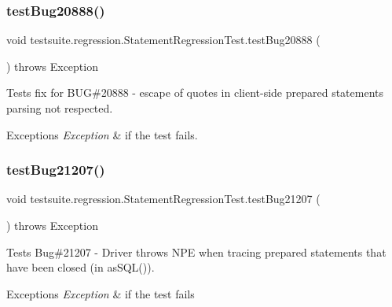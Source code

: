\subsubsection{\texorpdfstring{test\+Bug20888()}{testBug20888()}}
{\footnotesize\ttfamily void testsuite.\+regression.\+Statement\+Regression\+Test.\+test\+Bug20888 (\begin{DoxyParamCaption}{ }\end{DoxyParamCaption}) throws Exception}

Tests fix for B\+UG\#20888 -\/ escape of quotes in client-\/side prepared statements parsing not respected.


\begin{DoxyExceptions}{Exceptions}
{\em Exception} & if the test fails. \\
\hline
\end{DoxyExceptions}
\mbox{\label{classtestsuite_1_1regression_1_1_statement_regression_test_a16c4c52784a96bfcf47397ce9a1d0efb}} 
\subsubsection{\texorpdfstring{test\+Bug21207()}{testBug21207()}}
{\footnotesize\ttfamily void testsuite.\+regression.\+Statement\+Regression\+Test.\+test\+Bug21207 (\begin{DoxyParamCaption}{ }\end{DoxyParamCaption}) throws Exception}

Tests Bug\#21207 -\/ Driver throws N\+PE when tracing prepared statements that have been closed (in as\+S\+Q\+L()).


\begin{DoxyExceptions}{Exceptions}
{\em Exception} & if the test fails \\
\hline
\end{DoxyExceptions}
\mbox{\label{classtestsuite_1_1regression_1_1_statement_regression_test_a47c163cd72fcd1b2cf392941cd2b074c}} 
